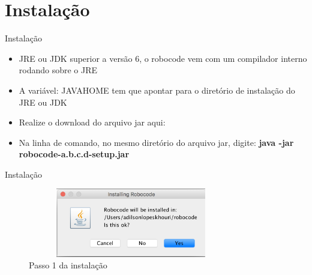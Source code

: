 %
%
%
%			



\section{Instalação}

\begin{frame}
	\begin{block}{Instalação}
		\begin{itemize}
			\item JRE ou JDK superior a versão 6, o robocode vem com um compilador interno rodando sobre o JRE

			\item A variável: JAVA\textunderscore HOME tem que apontar para o diretório de instalação do JRE ou JDK
			
			\item Realize o download do arquivo jar aqui: \href{https://sourceforge.net/projects/robocode/files/robocode/1.9.3.4/}{\color{blue}{Source Forge}} 
			
			\item Na linha de comando, no  mesmo diretório do arquivo jar, digite: \textbf{java -jar robocode-a.b.c.d-setup.jar}
						
		\end{itemize}
	\end{block}
\end{frame}


\begin{frame}
	\begin{block}{Instalação}
		 \begin{figure}[!htb]
			\centering	  				
			\includegraphics[height=3cm, width = 9cm]{./pic/instalacao01.png}
			\caption{Passo 1 da instalação}
			\label{fig_instalacao01}
		\end{figure}
	\end{block}
\end{frame}


